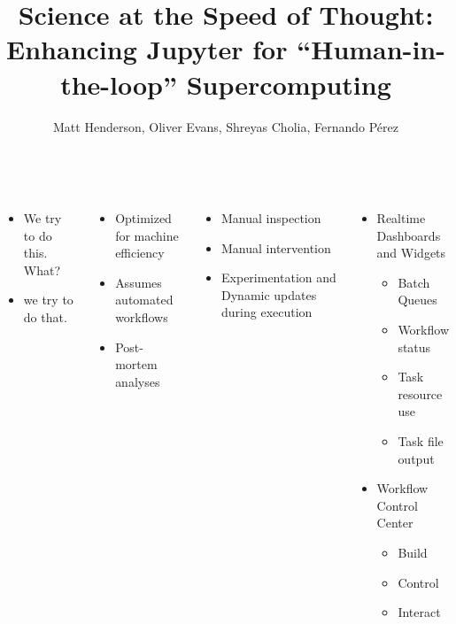 \documentclass{tikzposter}
\author{Matt Henderson, Oliver Evans, Shreyas Cholia, Fernando P\'{e}rez}
\title{Science at the Speed of Thought: Enhancing Jupyter for ``Human-in-the-loop'' Supercomputing}
\institute{Lawrence Berkeley National Laboratory}
\begin{document}
\maketitle

\begin{columns}

 {
    \begin{itemize}
        \item We try to do this. What?
        \item we try to do that.
    \end{itemize}
}

 {
    \begin{itemize}
        \item Optimized for machine efficiency
        \item Assumes automated workflows
        \item Post-mortem analyses
    \end{itemize}
}

 {
    \begin{itemize}
        \item Manual inspection
        \item Manual intervention
        \item Experimentation and Dynamic updates during execution
    \end{itemize}
}

 {
    \begin{itemize}
        \item Realtime Dashboards and Widgets
        \begin{itemize}
            \item Batch Queues
            \item Workflow status
            \item Task resource use
            \item Task file output
        \end{itemize}
        \item Workflow Control Center
        \begin{itemize}
            \item Build
            \item Control
            \item Interact
        \end{itemize}
    \end{itemize}
}    


\end{columns}
\end{document}
